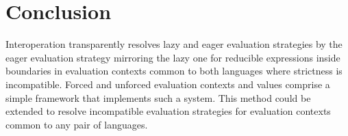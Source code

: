 \chapter{Conclusion}

Interoperation transparently resolves lazy and eager evaluation strategies by the eager evaluation strategy mirroring the lazy one for reducible expressions inside boundaries in evaluation contexts common to both languages where strictness is incompatible. Forced and unforced evaluation contexts and values comprise a simple framework that implements such a system. This method could be extended to resolve incompatible evaluation strategies for evaluation contexts common to any pair of languages.